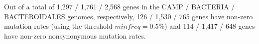 Out of a total of 1,297 / 1,761 / 2,568 genes in the CAMP / BACTERIA / BACTEROIDALES genomes, respectively, 126 / 1,530 / 765 genes have non-zero mutation rates (using the threshold $minfreq=0.5\%$) and 114 / 1,417 / 648 genes have non-zero nonsynonymous mutation rates.